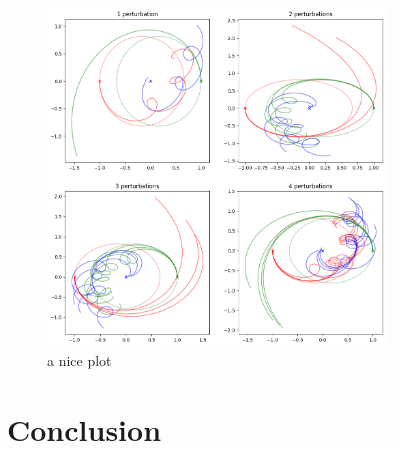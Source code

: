 \documentclass{article}
\begin{document}
\begin{figure}[h!]
    \centering
    \includegraphics[width=0.8\textwidth]{Images/perterbations1to4.png}
    \caption{a nice plot}
    \label{fig:mesh3}
\end{figure}

\section{Conclusion}
\end{document}
